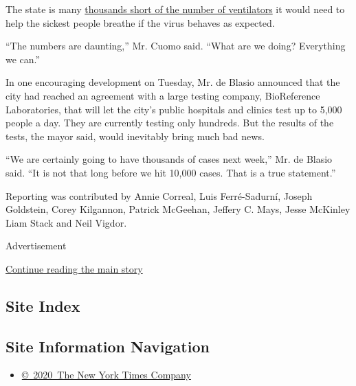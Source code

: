 The state is many
\href{https://www.nytimes3xbfgragh.onion/2020/03/17/nyregion/ny-coronavirus-ventilators.html}{thousands
short of the number of ventilators} it would need to help the sickest
people breathe if the virus behaves as expected.

``The numbers are daunting,'' Mr. Cuomo said. ``What are we doing?
Everything we can.''

In one encouraging development on Tuesday, Mr. de Blasio announced that
the city had reached an agreement with a large testing company,
BioReference Laboratories, that will let the city's public hospitals and
clinics test up to 5,000 people a day. They are currently testing only
hundreds. But the results of the tests, the mayor said, would inevitably
bring much bad news.

``We are certainly going to have thousands of cases next week,'' Mr. de
Blasio said. ``It is not that long before we hit 10,000 cases. That is a
true statement.''

Reporting was contributed by Annie Correal, Luis Ferré-Sadurní, Joseph
Goldstein, Corey Kilgannon, Patrick McGeehan, Jeffery C. Mays, Jesse
McKinley Liam Stack and Neil Vigdor.

Advertisement

\protect\hyperlink{after-bottom}{Continue reading the main story}

\hypertarget{site-index}{%
\subsection{Site Index}\label{site-index}}

\hypertarget{site-information-navigation}{%
\subsection{Site Information
Navigation}\label{site-information-navigation}}

\begin{itemize}
\tightlist
\item
  \href{https://help.nytimes3xbfgragh.onion/hc/en-us/articles/115014792127-Copyright-notice}{©~2020~The
  New York Times Company}
\end{itemize}

